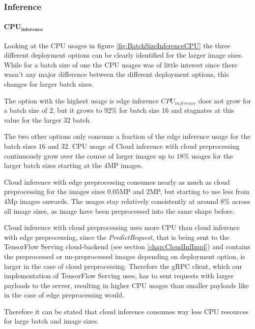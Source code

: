 \FloatBarrier
\subsubsection{Inference}

\paragraph{$\mathbf{CPU_{inference}}$}
Looking at the CPU usages in figure \ref{fig:BatchSizeInferenceCPU} the three different deployment options can be clearly identified for the larger image sizes.
While for a batch size of one the CPU usages was of little interest since there wasn't any major difference between the different deployment options, this changes for larger batch sizes.

The option with the highest usage is edge inference $CPU_{inference}$ does not grow for a batch size of $2$, but it grows to $92\%$ for batch size $16$ and stagnates at this value for the larger $32$ batch.

The two other options only consume a fraction of the edge inference usage for the batch sizes $16$ and $32$.
CPU usage of Cloud inference with cloud preprocessing continuously grow over the course of larger images up to $18\%$ usages for the larger batch sizes starting at the $4$MP images.

Cloud inference with edge preprocessing consumes nearly as much as cloud preprocessing for the images sizes $0.05$MP and $2$MP, but starting to use less from $4$Mp images onwards.
The usages stay relatively consistently at around $8\%$ across all image sizes, as image have been preprocessed into the same shape before.

Cloud inference with cloud preprocessing uses more CPU than cloud inference with edge preprocessing, since the \emph{PredictRequest}, that is being sent to the TensorFlow Serving cloud-backend (see section \ref{chap:CloudInfImpl}) and contains the preprocessed or un-preprocessed images depending on deployment option, is larger in the case of cloud preprocessing.
Therefore the gRPC client, which our implementation of TensorFlow Serving uses, has to sent requests with larger payloads to the server, resulting in higher CPU usages than smaller payloads like in the case of edge preprocessing would.


Therefore it can be stated that cloud inference consumes way less CPU resources for large batch and image sizes.

